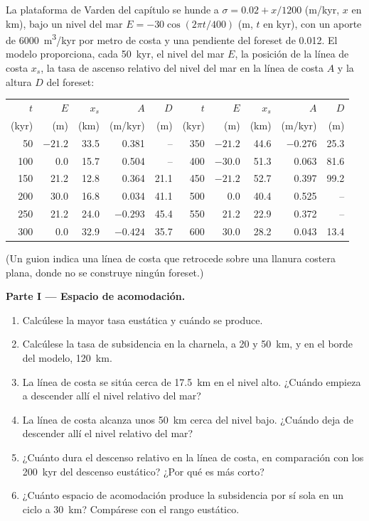 \begin{problem}
\label{pb:b3:sequence-stratigraphy:1}
La plataforma de Varden del capítulo se hunde a $\sigma = 0.02 + x/1200$
(\unit{m/kyr}, $x$ en km), bajo un nivel del mar $E = -30\cos(2\pi t/400)$ (m,
$t$ en kyr), con un aporte de \qty{6000}{m^3/kyr} por metro de costa y una
pendiente del foreset de 0.012. El modelo proporciona, cada \qty{50}{kyr}, el nivel del mar
$E$, la posición de la línea de costa $x_s$, la tasa de ascenso relativo del nivel del mar en la
línea de costa $A$ y la altura $D$ del foreset:

\begin{center}\small
\begin{tabular}{rrrrr|rrrrr}
$t$ & $E$ & $x_s$ & $A$ & $D$ & $t$ & $E$ & $x_s$ & $A$ & $D$\\
(kyr) & (m) & (km) & (m/kyr) & (m) & (kyr) & (m) & (km) & (m/kyr) & (m)\\\hline
50 & $-21.2$ & 33.5 & 0.381 & -- & 350 & $-21.2$ & 44.6 & $-0.276$ & 25.3\\
100 & 0.0 & 15.7 & 0.504 & -- & 400 & $-30.0$ & 51.3 & 0.063 & 81.6\\
150 & 21.2 & 12.8 & 0.364 & 21.1 & 450 & $-21.2$ & 52.7 & 0.397 & 99.2\\
200 & 30.0 & 16.8 & 0.034 & 41.1 & 500 & 0.0 & 40.4 & 0.525 & --\\
250 & 21.2 & 24.0 & $-0.293$ & 45.4 & 550 & 21.2 & 22.9 & 0.372 & --\\
300 & 0.0 & 32.9 & $-0.424$ & 35.7 & 600 & 30.0 & 28.2 & 0.043 & 13.4\\
\end{tabular}
\end{center}
(Un guion indica una línea de costa que retrocede sobre una llanura costera plana, donde no
se construye ningún foreset.)

\medskip\noindent\textbf{Parte I --- Espacio de acomodación.}
\begin{enumerate}
\item Calcúlese la mayor tasa eustática y cuándo se produce.
\item Calcúlese la tasa de subsidencia en la charnela, a 20 y \qty{50}{km}, y
  en el borde del modelo, \qty{120}{km}.
\item La línea de costa se sitúa cerca de \qty{17.5}{km} en el nivel alto.
  ¿Cuándo empieza a descender allí el nivel relativo del mar?
\item La línea de costa alcanza unos \qty{50}{km} cerca del nivel bajo.
  ¿Cuándo deja de descender allí el nivel relativo del mar?
\item ¿Cuánto dura el descenso relativo en la línea de costa, en comparación con
  los \qty{200}{kyr} del descenso eustático? ¿Por qué es más corto?
\item ¿Cuánto espacio de acomodación produce la subsidencia por sí sola en un ciclo a
  \qty{30}{km}? Compárese con el rango eustático.
\end{enumerate}


\end{problem}
